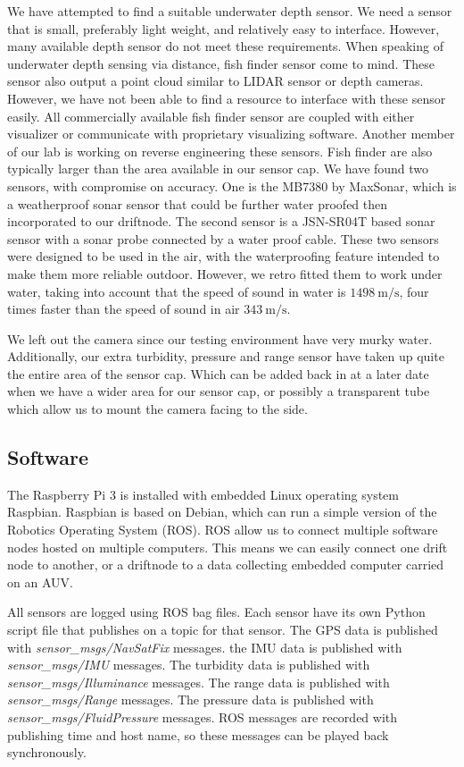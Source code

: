 We have attempted to find a suitable underwater depth sensor.
We need a sensor that is small, preferably light weight, and relatively easy to interface.
However, many available depth sensor do not meet these requirements.
When speaking of underwater depth sensing via distance, fish finder sensor come to mind.
These sensor also output a point cloud similar to LIDAR sensor or depth cameras.
However, we have not been able to find a resource to interface with these sensor easily.
All commercially available fish finder sensor are coupled with either visualizer or communicate with proprietary visualizing software.
Another member of our lab is working on reverse engineering these sensors.
Fish finder are also typically larger than the area available in our sensor cap.
We have found two sensors, with compromise on accuracy.
One is the MB7380 by MaxSonar, which is a weatherproof sonar sensor that could be further water proofed then incorporated to our driftnode.
The second sensor is a JSN-SR04T based sonar sensor with a sonar probe connected by a water proof cable.
These two sensors were designed to be used in the air, with the waterproofing feature intended to make them more reliable outdoor.
However, we retro fitted them to work under water, taking into account that the speed of sound in water is $\SI{1498}{\metre/\second}$, four times faster than the speed of sound in air $\SI{343}{\metre/\second}$.

We left out the camera since our testing environment have very murky water.
Additionally, our extra turbidity, pressure and range sensor have taken up quite the entire area of the sensor cap.
Which can be added back in at a later date when we have a wider area for our sensor cap, or possibly a transparent tube which allow us to mount the camera facing to the side.

\subsection[Software]{Software}

The Raspberry Pi 3 is installed with embedded Linux operating system Raspbian.
Raspbian is based on Debian, which can run a simple version of the Robotics Operating System (ROS).
ROS allow us to connect multiple software nodes hosted on multiple computers.
This means we can easily connect one drift node to another, or a driftnode to a data collecting embedded computer carried on an AUV.

All sensors are logged using ROS bag files.
Each sensor have its own Python script file that publishes on a topic for that sensor.
The GPS data is published with \textit{sensor\_msgs/NavSatFix} messages.
the IMU data is published with \textit{sensor\_msgs/IMU} messages.
The turbidity data is published with \textit{sensor\_msgs/Illuminance} messages.
The range data is published with \textit{sensor\_msgs/Range} messages.
The pressure data is published with \textit{sensor\_msgs/FluidPressure} messages.
ROS messages are recorded with publishing time and host name, so these messages can be played back synchronously.


